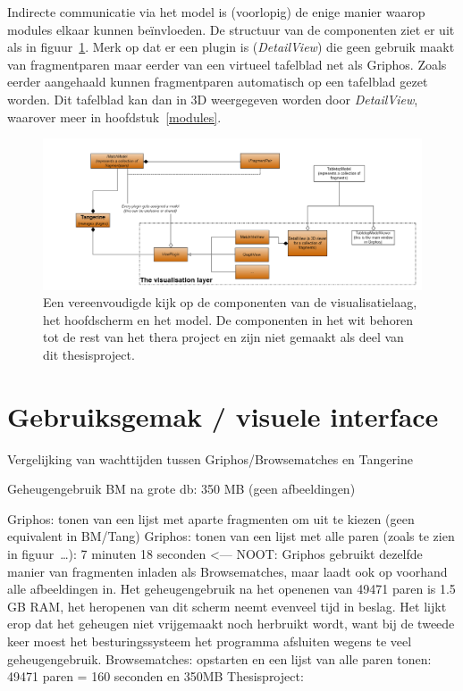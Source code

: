 Indirecte communicatie via het model is (voorlopig) de enige manier waarop modules elkaar kunnen be\"invloeden. De structuur van de componenten ziet er uit als in figuur~\ref{fig:visualizationlayer}. Merk op dat er een plugin is (\emph{DetailView}) die geen gebruik maakt van fragmentparen maar eerder van een virtueel tafelblad net als Griphos. Zoals eerder aangehaald kunnen fragmentparen automatisch op een tafelblad gezet worden. Dit tafelblad kan dan in 3D weergegeven worden door \emph{DetailView}, waarover meer in hoofdstuk~\ref{modules}.

\begin{figure}[h]
	\begin{center}
		\includegraphics[width=1.0\columnwidth]{images/VisualizationExtract.png}
		\caption{Een vereenvoudigde kijk op de componenten van de visualisatielaag, het hoofdscherm en het model. De componenten in het wit behoren tot de rest van het thera project en zijn niet gemaakt als deel van dit thesisproject.}
		\label{fig:visualizationlayer}
	\end{center}
\end{figure}

\section{Gebruiksgemak / visuele interface}

Vergelijking van wachttijden tussen Griphos/Browsematches en Tangerine

Geheugengebruik BM na grote db: 350 MB (geen afbeeldingen)

Griphos: tonen van een lijst met aparte fragmenten om uit te kiezen (geen equivalent in BM/Tang)
Griphos: tonen van een lijst met alle paren (zoals te zien in figuur~\ldots): 7 minuten 18 seconden <--- NOOT: Griphos gebruikt dezelfde manier van fragmenten inladen als Browsematches, maar laadt ook op voorhand alle afbeeldingen in. Het geheugengebruik na het openenen van 49471 paren is 1.5 GB RAM, het heropenen van dit scherm neemt evenveel tijd in beslag. Het lijkt erop dat het geheugen niet vrijgemaakt noch herbruikt wordt, want bij de tweede keer moest het besturingssysteem het programma afsluiten wegens te veel geheugengebruik.
Browsematches: opstarten en een lijst van alle paren tonen: 49471 paren = 160 seconden en 350MB
Thesisproject: 

